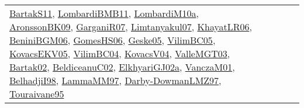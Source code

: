 {\begin{longtable}{lp{3cm}>{\raggedright}p{6cm}>{\raggedright}p{6cm}p{8cm}}
\href{articles/BartakS11.pdf}{BartakS11}\cite{BartakS11}, \href{papers/LombardiBMB11.pdf}{LombardiBMB11}\cite{LombardiBMB11}, \href{articles/LombardiM10a.pdf}{LombardiM10a}\cite{LombardiM10a}, \href{papers/AronssonBK09.pdf}{AronssonBK09}\cite{AronssonBK09}, \href{papers/GarganiR07.pdf}{GarganiR07}\cite{GarganiR07}, \href{papers/Limtanyakul07.pdf}{Limtanyakul07}\cite{Limtanyakul07}, \href{articles/KhayatLR06.pdf}{KhayatLR06}\cite{KhayatLR06}, \href{papers/BeniniBGM06.pdf}{BeniniBGM06}\cite{BeniniBGM06}, \href{papers/GomesHS06.pdf}{GomesHS06}\cite{GomesHS06}, \href{papers/Geske05.pdf}{Geske05}\cite{Geske05}, \href{articles/VilimBC05.pdf}{VilimBC05}\cite{VilimBC05}, \href{papers/KovacsEKV05.pdf}{KovacsEKV05}\cite{KovacsEKV05}, \href{papers/VilimBC04.pdf}{VilimBC04}\cite{VilimBC04}, \href{papers/KovacsV04.pdf}{KovacsV04}\cite{KovacsV04}, \href{papers/ValleMGT03.pdf}{ValleMGT03}\cite{ValleMGT03}, \href{papers/Bartak02.pdf}{Bartak02}\cite{Bartak02}, \href{papers/BeldiceanuC02.pdf}{BeldiceanuC02}\cite{BeldiceanuC02}, \href{papers/ElkhyariGJ02a.pdf}{ElkhyariGJ02a}\cite{ElkhyariGJ02a}, \href{papers/VanczaM01.pdf}{VanczaM01}\cite{VanczaM01}, \href{articles/BelhadjiI98.pdf}{BelhadjiI98}\cite{BelhadjiI98}, \href{articles/LammaMM97.pdf}{LammaMM97}\cite{LammaMM97}, \href{articles/Darby-DowmanLMZ97.pdf}{Darby-DowmanLMZ97}\cite{Darby-DowmanLMZ97}, \href{papers/Touraivane95.pdf}{Touraivane95}\cite{Touraivane95}\\

\end{longtable}}
